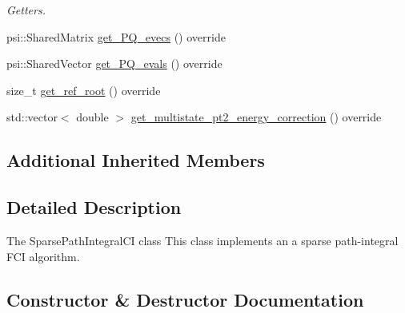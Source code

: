 \begin{DoxyCompactItemize}
\begin{DoxyCompactList}\small\item\em Getters. \end{DoxyCompactList}\item 
psi\+::\+Shared\+Matrix \mbox{\hyperlink{classforte_1_1_projector_c_i_a3c3dd33031ea7f0764c34db25e8d03a4}{get\+\_\+\+P\+Q\+\_\+evecs}} () override
\item 
psi\+::\+Shared\+Vector \mbox{\hyperlink{classforte_1_1_projector_c_i_ad6e48a524b58412a569858c9c2b1c232}{get\+\_\+\+P\+Q\+\_\+evals}} () override
\item 
size\+\_\+t \mbox{\hyperlink{classforte_1_1_projector_c_i_ad4774357cde1564dd6a2f17bb0452174}{get\+\_\+ref\+\_\+root}} () override
\item 
std\+::vector$<$ double $>$ \mbox{\hyperlink{classforte_1_1_projector_c_i_aa812688cd77719876ea535f49b835c57}{get\+\_\+multistate\+\_\+pt2\+\_\+energy\+\_\+correction}} () override
\end{DoxyCompactItemize}
\subsection*{Additional Inherited Members}


\subsection{Detailed Description}
The Sparse\+Path\+Integral\+CI class This class implements an a sparse path-\/integral F\+CI algorithm. 

\subsection{Constructor \& Destructor Documentation}
\mbox{\label{classforte_1_1_projector_c_i_a478bdd78ee2686f927839e726b38de52}} 
